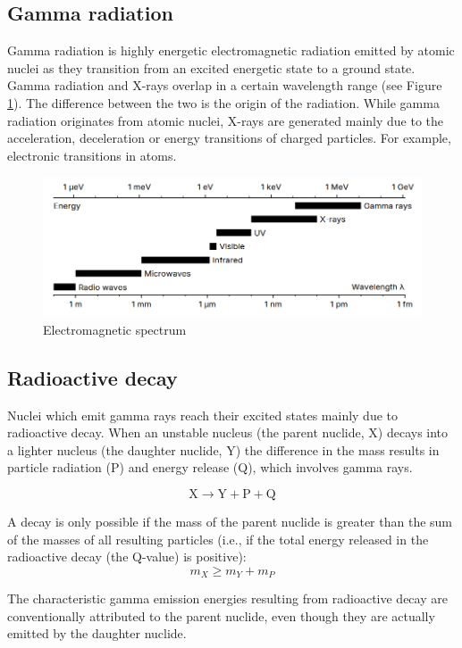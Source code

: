 \documentclass{article}
\begin{document}
\subsection{Gamma radiation}
Gamma radiation is highly energetic electromagnetic radiation emitted by atomic nuclei as they transition from an excited energetic state to a ground state. Gamma radiation and X-rays overlap in a certain wavelength range (see Figure \ref{fig:EMspectrum}). The difference between the two is the origin of the radiation. While gamma radiation originates from atomic nuclei, X-rays are generated mainly due to the acceleration, deceleration or energy transitions of charged particles. For example, electronic transitions in atoms. 

\begin{figure}[h]
    \centering
    \includegraphics[width=0.5\linewidth]{Figures/Intro/1.png}
    \caption{Electromagnetic spectrum \cite{plotzki_2024_highresolution}}
    \label{fig:EMspectrum}
\end{figure}

\subsection{Radioactive decay}
Nuclei which emit gamma rays reach their excited states mainly due to radioactive decay. When an unstable nucleus (the parent nuclide, X) decays into a lighter nucleus (the daughter nuclide, Y) the difference in the mass results in particle radiation (P) and energy release (Q), which involves gamma rays. 

\begin{equation*}
\text{X} \rightarrow \text{Y} + \text{P} + \text{Q}
\end{equation*}

A decay is only possible if the mass of the parent
nuclide is greater than the sum of the masses of
all resulting particles (i.e., if the total energy released in the radioactive decay (the Q-value) is positive): 
\begin{equation}
    m_X \geq m_Y + m_P
\end{equation}

The characteristic gamma emission energies resulting from radioactive decay are conventionally attributed to the parent nuclide, even though they are actually emitted by the daughter nuclide.
\end{document}
